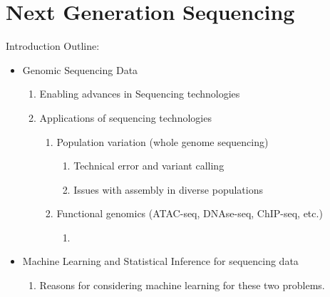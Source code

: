 \chapter{\label{ch:1-intro} Next Generation Sequencing} 

\minitoc


Introduction Outline: 

\begin{itemize}
    \item Genomic Sequencing Data
        
    \begin{enumerate}
        \item Enabling advances in Sequencing technologies
        \item Applications of sequencing technologies
        \begin{enumerate}
            \item Population variation (whole genome sequencing)
            \begin{enumerate}
                \item Technical error and variant calling
                \item Issues with assembly in diverse populations
            \end{enumerate}
            \item Functional genomics (ATAC-seq, DNAse-seq, ChIP-seq, etc.)
            \begin{enumerate}
                \item 
            \end{enumerate}
        \end{enumerate}

    \end{enumerate}

    \item Machine Learning and Statistical Inference for sequencing data
    \begin{enumerate}
        \item Reasons for considering machine learning for these two problems.
    \end{enumerate} 
     

\end{itemize}
